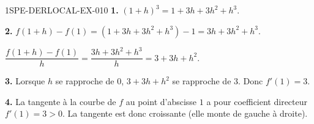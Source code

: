 \begin{corrige}{1SPE-DERLOCAL-EX-010}
\textbf{1.} $(1+h)^3=1+3h+3h^2+h^3$.

\textbf{2.} $f(1+h)-f(1)=(1+3h+3h^2+h^3)-1=3h+3h^2+h^3$.

$\dfrac{f(1+h)-f(1)}{h}=\dfrac{3h+3h^2+h^3}{h}=3+3h+h^2$.

\textbf{3.} Lorsque $h$ se rapproche de $0$, $3+3h+h^2$ se rapproche de $3$. Donc $f'(1)=3$.

\textbf{4.} La tangente à la courbe de $f$ au point d'abscisse $1$ a pour coefficient directeur $f'(1)=3>0$. La tangente est donc croissante (elle monte de gauche à droite).
\end{corrige}
